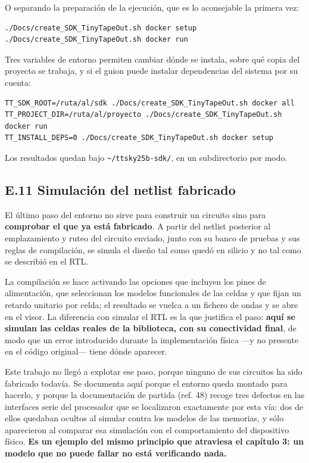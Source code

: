 O separando la preparación de la ejecución, que es lo aconsejable la
primera vez:

\begin{verbatim}
./Docs/create_SDK_TinyTapeOut.sh docker setup
./Docs/create_SDK_TinyTapeOut.sh docker run
\end{verbatim}

Tres variables de entorno permiten cambiar dónde se instala, sobre qué
copia del proyecto se trabaja, y si el guion puede instalar dependencias
del sistema por su cuenta:

\begin{verbatim}
TT_SDK_ROOT=/ruta/al/sdk ./Docs/create_SDK_TinyTapeOut.sh docker all
TT_PROJECT_DIR=/ruta/al/proyecto ./Docs/create_SDK_TinyTapeOut.sh docker run
TT_INSTALL_DEPS=0 ./Docs/create_SDK_TinyTapeOut.sh docker setup
\end{verbatim}

Los resultados quedan bajo \texttt{\textasciitilde{}/ttsky25b-sdk/}, en
un subdirectorio por modo.

\subsection{E.11 Simulación del netlist
fabricado}\label{e.11-simulaciuxf3n-del-netlist-fabricado}

El último paso del entorno no sirve para construir un circuito sino para
\textbf{comprobar el que ya está fabricado}. A partir del netlist
posterior al emplazamiento y ruteo del circuito enviado, junto con su
banco de pruebas y sus reglas de compilación, se simula el diseño tal
como quedó en silicio y no tal como se describió en el RTL.

La compilación se hace activando las opciones que incluyen los pines de
alimentación, que seleccionan los modelos funcionales de las celdas y
que fijan un retardo unitario por celda; el resultado se vuelca a un
fichero de ondas y se abre en el visor. La diferencia con simular el RTL
es la que justifica el paso: \textbf{aquí se simulan las celdas reales
de la biblioteca, con su conectividad final}, de modo que un error
introducido durante la implementación física ---y no presente en el
código original--- tiene dónde aparecer.

Este trabajo no llegó a explotar ese paso, porque ninguno de sus
circuitos ha sido fabricado todavía. Se documenta aquí porque el entorno
queda montado para hacerlo, y porque la documentación de partida (ref.
48) recoge tres defectos en las interfaces serie del procesador que se
localizaron exactamente por esta vía: dos de ellos quedaban ocultos al
simular contra los modelos de las memorias, y sólo aparecieron al
comparar esa simulación con el comportamiento del dispositivo físico.
\textbf{Es un ejemplo del mismo principio que atraviesa el capítulo 3:
un modelo que no puede fallar no está verificando nada.}

